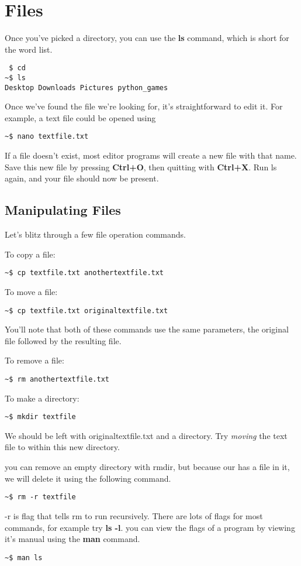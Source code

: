 \section{Files}
	
	Once you've picked a directory, you can use the \textbf{ls} command, which is short for the word list.
	
\begin{lstlisting}
 $ cd
~$ ls
Desktop Downloads Pictures python_games
\end{lstlisting}

	Once we've found the file we're looking for, it's straightforward to edit it. For example, a text file could be opened using
	
\begin{lstlisting}
~$ nano textfile.txt
\end{lstlisting}	

	If a file doesn't exist, most editor programs will create a new file with that name. Save this new file by pressing \textbf{Ctrl+O}, then quitting with \textbf{Ctrl+X}. Run ls again, and your file should now be present.

	\subsection{Manipulating Files}
	
		Let's blitz through a few file operation commands.
		
		To copy a file:
\begin{lstlisting}
~$ cp textfile.txt anothertextfile.txt
\end{lstlisting}

		To move a file:
\begin{lstlisting}
~$ cp textfile.txt originaltextfile.txt
\end{lstlisting}

		You'll note that both of these commands use the same parameters, the original file followed by the resulting file.

		To remove a file:	
\begin{lstlisting}
~$ rm anothertextfile.txt
\end{lstlisting}

		To make a directory:		
\begin{lstlisting}
~$ mkdir textfile
\end{lstlisting}

		We should be left with originaltextfile.txt and a directory. Try \textit{moving} the text file to within this new directory.
		
		you can remove an empty directory with rmdir, but because our has a file in it, we will delete it using the following command.
\begin{lstlisting}
~$ rm -r textfile
\end{lstlisting}

		-r is flag that tells rm to run recursively. There are lots of flags for most commands, for example try \textbf{ls -l}. you can view the flags of a program by viewing it's manual using the \textbf{man} command.
\begin{lstlisting}
~$ man ls
\end{lstlisting}
		
		